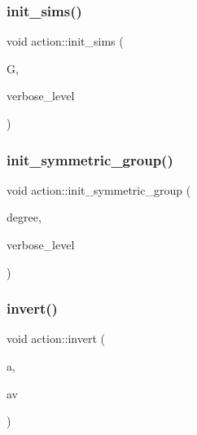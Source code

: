 \mbox{\label{classaction_a74656357e44267b594ede82318fe124c}} 
\subsubsection{\texorpdfstring{init\+\_\+sims()}{init\_sims()}}
{\footnotesize\ttfamily void action\+::init\+\_\+sims (\begin{DoxyParamCaption}\item[{\mbox{\hyperlink{classsims}{sims}} $\ast$}]{G,  }\item[{\mbox{\hyperlink{galois_8h_a09fddde158a3a20bd2dcadb609de11dc}{I\+NT}}}]{verbose\+\_\+level }\end{DoxyParamCaption})}

\mbox{\label{classaction_ac6d0d7bdfba9eb39febe3c2f0bd38281}} 
\subsubsection{\texorpdfstring{init\+\_\+symmetric\+\_\+group()}{init\_symmetric\_group()}}
{\footnotesize\ttfamily void action\+::init\+\_\+symmetric\+\_\+group (\begin{DoxyParamCaption}\item[{\mbox{\hyperlink{galois_8h_a09fddde158a3a20bd2dcadb609de11dc}{I\+NT}}}]{degree,  }\item[{\mbox{\hyperlink{galois_8h_a09fddde158a3a20bd2dcadb609de11dc}{I\+NT}}}]{verbose\+\_\+level }\end{DoxyParamCaption})}

\mbox{\label{classaction_aa498723c58a9a8cf1da296044127a428}} 
\subsubsection{\texorpdfstring{invert()}{invert()}}
{\footnotesize\ttfamily void action\+::invert (\begin{DoxyParamCaption}\item[{void $\ast$}]{a,  }\item[{void $\ast$}]{av }\end{DoxyParamCaption})}


